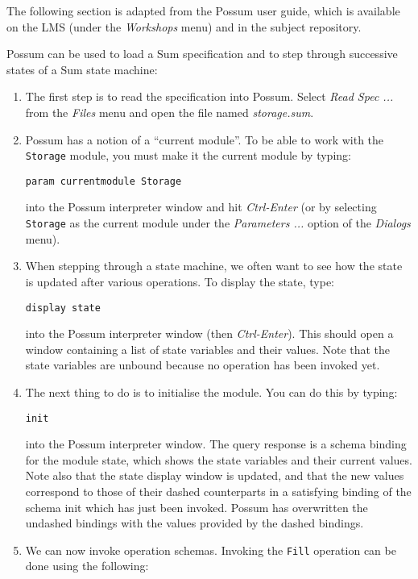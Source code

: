 \documentclass{article}
\begin{document}
The following section is adapted from the Possum user guide, which is available on the LMS (under the \emph{Workshops} menu) and in the subject repository.

Possum can be used to load a Sum specification and to step through successive states of a Sum state machine:

\begin{enumerate}

 \item The first step is to read the specification into Possum. Select \emph{Read Spec ...} from the \emph{Files} menu and open the file named \emph{storage.sum}.

 \item Possum has a notion of a ``current module''. To be able to work with the \texttt{Storage} module, you must make it the current module by typing:

\quad\quad \texttt{param currentmodule Storage}

into the Possum interpreter window and hit \emph{Ctrl-Enter} (or by selecting \texttt{Storage} as the current module under the \emph{Parameters ...} option of the \emph{Dialogs} menu).

 \item  When stepping through a state machine, we often want to see how the state is updated after various operations. To display the state, type:

\quad\quad \texttt{display state}

into the Possum interpreter window (then \emph{Ctrl-Enter}). This should open a window containing a list of state variables and their values. Note that the state variables are unbound because no operation has been invoked yet.

\item The next thing to do is to initialise the module. You can do this by typing:

\quad\quad \texttt{init}

into the Possum interpreter window. The query response is a schema binding for the module state, which shows the state variables and their current values. Note also that the state display window is updated, and that the new values correspond to those of their dashed counterparts in a satisfying binding of the schema init which has just been invoked. Possum has overwritten the undashed bindings with the values provided by the dashed bindings.

\item We can now invoke operation schemas. Invoking the \texttt{Fill} operation can be done using the following:


\end{enumerate}
\end{document}
